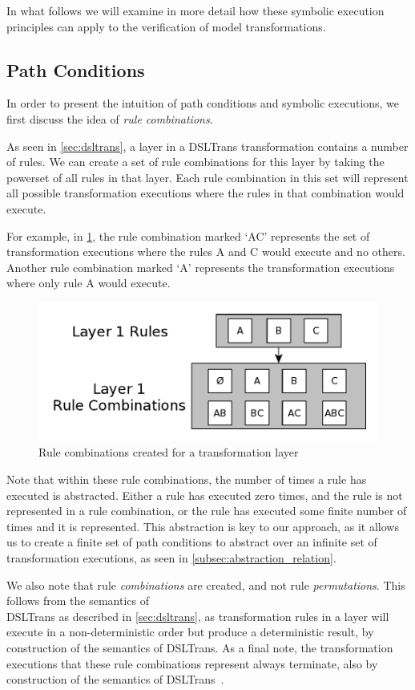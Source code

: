 In what follows we will examine in more detail how these symbolic execution
principles can apply to the verification of model transformations.


\subsection{Path Conditions}
\label{subsec:gen_path_conds}

In order to present the intuition of path conditions and symbolic executions, we
first discuss the idea of \textit{rule combinations}.

As seen in \cref{sec:dsltrans}, a layer in a DSLTrans transformation contains a
number of rules.  We can create a set of rule combinations for this layer by
taking the powerset of all rules in that layer. Each rule combination in this
set will represent all possible transformation executions where the rules in
that combination would execute.

For example, in \cref{fig:rule_combos2}, the rule combination marked `AC'
represents the set of transformation executions where the rules A and C would
execute and no others. Another rule combination marked `A' represents the
transformation executions where only rule A would execute.

\begin{figure}[h!] \centering \includegraphics[width=.40\textwidth]{./figures/overview/rule_combos.pdf}
	\caption{Rule combinations created for a transformation layer}
	\label{fig:rule_combos2}
\end{figure}

Note that within these rule combinations, the number of times a rule has
executed is abstracted. Either a rule has executed zero times, and the rule is
not represented in a rule combination, or the rule has executed some finite
number of times and it is represented. This abstraction is key to our approach,
as it allows us to create a finite set of path conditions to abstract over an
infinite set of transformation executions, as seen in
\cref{subsec:abstraction_relation}.

We also note that rule \textit{combinations} are created, and not rule
\textit{permutations}. This follows from the semantics of \\DSLTrans as described
in \cref{sec:dsltrans}, as transformation rules in a layer will execute in a
non-deterministic order but produce a deterministic result, by construction of the semantics of DSLTrans. As a final
note, the transformation executions that these rule combinations represent always terminate, also by construction of the semantics of DSLTrans~\cite{DBLP:conf/sle/BarrocaLAFS10}.

